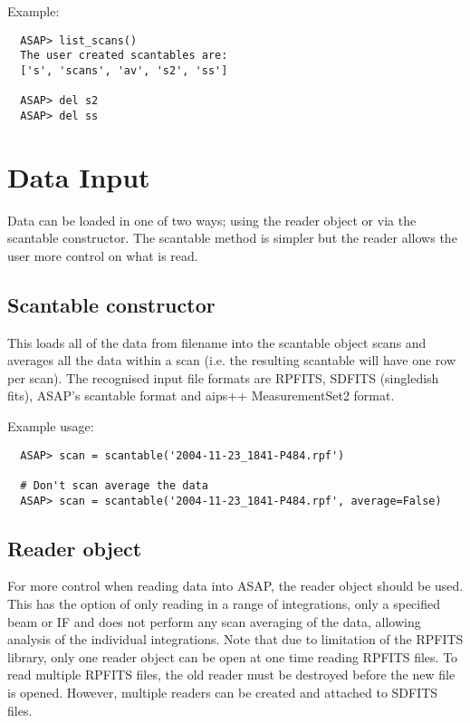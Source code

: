\documentclass[11pt]{article}
\begin{document}
Example:

\begin{verbatim}
  ASAP> list_scans()
  The user created scantables are:
  ['s', 'scans', 'av', 's2', 'ss']

  ASAP> del s2
  ASAP> del ss
\end{verbatim}

\section{Data Input}

Data can be loaded in one of two ways; using the
reader object or via the scantable constructor. The scantable method
is simpler but the reader allows the user more control on what is read.

\subsection{Scantable constructor}

This loads
all of the data from filename into the scantable object scans and
averages all the data within a scan (i.e.  the resulting scantable
will have one row per scan).  The recognised input file formats are
RPFITS, SDFITS (singledish fits), ASAP's scantable format and aips++
MeasurementSet2 format.

Example usage:

\begin{verbatim}
  ASAP> scan = scantable('2004-11-23_1841-P484.rpf')

  # Don't scan average the data
  ASAP> scan = scantable('2004-11-23_1841-P484.rpf', average=False)
\end{verbatim}


\subsection{Reader object}

For more control
when reading data into ASAP, the reader object should be used.  This
has the option of only reading in a range of integrations, only a
specified beam or IF and does not perform any scan averaging of the
data, allowing analysis of the individual integrations.  Note that due
to limitation of the RPFITS library, only one reader object can be
open at one time reading RPFITS files.  To read multiple RPFITS files,
the old reader must be destroyed before the new file is opened.
However, multiple readers can be created and attached to SDFITS files.
\end{document}
